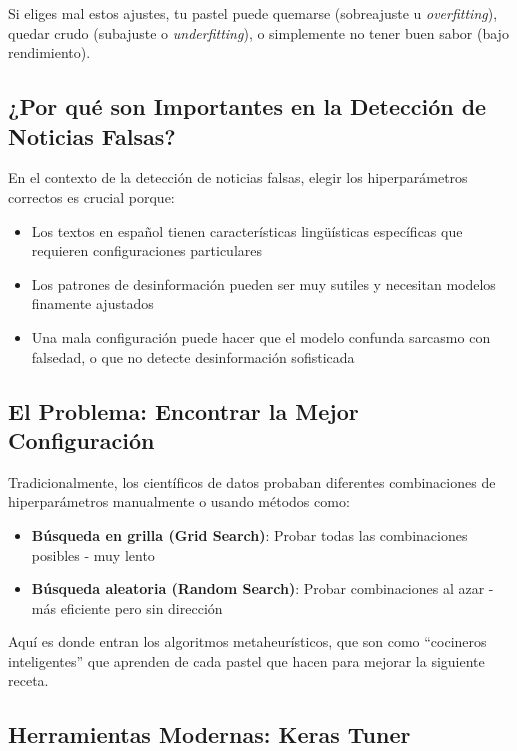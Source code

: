 Si eliges mal estos ajustes, tu pastel puede quemarse (sobreajuste u \textit{overfitting}), quedar crudo (subajuste o \textit{underfitting}), o simplemente no tener buen sabor (bajo rendimiento).

\subsection{¿Por qué son Importantes en la Detección de Noticias Falsas?}

En el contexto de la detección de noticias falsas, elegir los hiperparámetros correctos es crucial porque:

\begin{itemize}
    \item Los textos en español tienen características lingüísticas específicas que requieren configuraciones particulares
    \item Los patrones de desinformación pueden ser muy sutiles y necesitan modelos finamente ajustados
    \item Una mala configuración puede hacer que el modelo confunda sarcasmo con falsedad, o que no detecte desinformación sofisticada
\end{itemize}

\subsection{El Problema: Encontrar la Mejor Configuración}

Tradicionalmente, los científicos de datos probaban diferentes combinaciones de hiperparámetros manualmente o usando métodos como:

\begin{itemize}
    \item \textbf{Búsqueda en grilla (Grid Search)}: Probar todas las combinaciones posibles - muy lento
    \item \textbf{Búsqueda aleatoria (Random Search)}: Probar combinaciones al azar - más eficiente pero sin dirección
\end{itemize}

Aquí es donde entran los algoritmos metaheurísticos, que son como ``cocineros inteligentes'' que aprenden de cada pastel que hacen para mejorar la siguiente receta.

\subsection{Herramientas Modernas: Keras Tuner}

